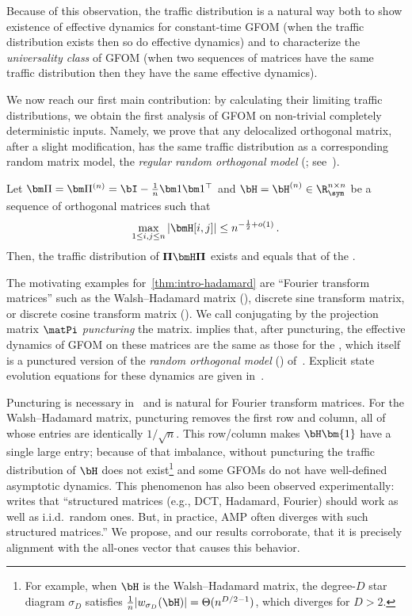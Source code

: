 Because of this observation, the traffic distribution is a natural way both to show existence of effective dynamics for constant-time GFOM (when the traffic distribution exists then so do effective dynamics) and to characterize the \emph{universality class} of GFOM
(when two sequences of matrices have the same traffic distribution then they have the same effective dynamics).

We now reach our first main contribution: by calculating their limiting traffic distributions, we obtain the first analysis of GFOM on non-trivial completely deterministic inputs.
Namely, we prove that any delocalized orthogonal matrix, after a slight modification, has the same traffic distribution as a corresponding random matrix model, the \emph{regular random orthogonal model} (\rrom; see~).

\begin{theorem}
    \label{thm:intro-hadamard}
    Let $\bm \Pi = \bm \Pi^{(n)} = \bI - \frac 1n \bm 1 \bm 1^\top$ and $\bH = \bH^{(n)}\in\R_{\sym}^{n\times n}$ be a sequence of orthogonal matrices such that
    \begin{align}
        \max_{1\le i, j\le n} |\bmH[i,j]|\le n^{-\frac 12 + o(1)}\,.\label{eq:delocalization}
    \end{align}
    Then, the traffic distribution of $\mathbf \Pi \bmH \mathbf \Pi$
    exists and equals that of the \rrom.
\end{theorem}
\noindent
The motivating examples for~\cref{thm:intro-hadamard} are ``Fourier transform matrices'' such as the Walsh--Hadamard matrix (), discrete sine transform matrix, or discrete cosine transform matrix ().
We call conjugating by the projection matrix $\matPi$ \emph{puncturing} the matrix.
 implies
that, after puncturing, the effective dynamics of GFOM
on these matrices are the same as those for the \rrom, which itself is a punctured version of the \emph{random orthogonal model} (\rom) of~\cite{marinari1994replicaI}.
Explicit state evolution equations for these dynamics are given in~.

Puncturing is necessary in~ and is natural for Fourier transform matrices. For the Walsh--Hadamard matrix, puncturing removes the first row and column, all of whose entries are identically $1/\sqrt{n}$.
This row/column makes $\bH\bm{1}$ have a single large entry; because of that imbalance, without puncturing the traffic distribution of $\bH$ does not exist\footnote{For example, when $\bH$ is the Walsh--Hadamard matrix, the degree-$D$ star diagram $\sigma_D$ satisfies $\frac 1n |w_{\sigma_D}(\bH)| = \Theta(n^{D/2-1})$, which diverges for $D>2$.} and some GFOMs do not have well-defined asymptotic dynamics.
This phenomenon has also been observed experimentally: \cite{schniter2020simple} writes that ``structured matrices (e.g., DCT, Hadamard, Fourier) should work as
well as i.i.d.\ random ones. But, in practice, AMP often diverges with such structured matrices.''
We propose, and our results corroborate, that it is precisely alignment with the all-ones vector that causes this behavior.


